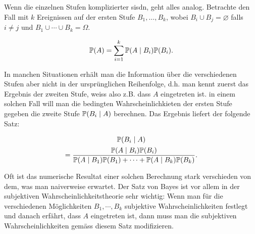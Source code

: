 Wenn die einzelnen Stufen komplizierter sisdn, geht alles analog. Betrachte den Fall mit $k$ Ereignissen auf der ersten Stufe $B_1,\ldots,B_k$, wobei $B_i\cup B_j=\varnothing$ falls $i\neq j$ und $B_1\cup \cdots \cup B_k=\Omega$.
\begin{satz}
	\begin{gather*}
		\mathbb P(A)=\sum_{i=1}^{k}\mathbb P(A\mid B_i)\mathbb P(B_i).
	\end{gather*}
\end{satz}
In manchen Situationen erhält man die Information über die verschiedenen Stufen aber nicht in der ursprünglichen Reihenfolge, d.h. man kennt zuerst das Ergebnis der zweiten Stufe, weiss also z.B. dass $A$ eingetreten ist. in einem solchen Fall will man die bedingten Wahrscheinlichkieten der ersten Stufe gegeben die zweite Stufe $\mathbb P(B_i\mid A)$ berechnen. Das Ergebnis liefert der folgende Satz:
\begin{satz}
	\begin{multline*}
		\mathbb P(B_i\mid A)\\=\frac{\mathbb P(A\mid B_i)\mathbb P(B_i)}{\mathbb P(A\mid B_1)\mathbb P(B_1)+ \cdots+ \mathbb P(A\mid B_k)\mathbb P(B_k)}.
	\end{multline*}
\end{satz}
Oft ist das numerische Resultat einer solchen Berechnung stark verschieden von dem, was man naiverweise erwartet. Der Satz von Bayes ist vor allem in der subjektiven Wahrscheinlichkeitstheorie sehr wichtig: Wenn man für die verschiedenen Möglichkeiten $B_1,\cdots,B_k$ subjektive Wahrscheinlichkeiten festlegt und danach erfährt, dass $A$ eingetreten ist, dann muss man die subjektiven Wahrscheinlichkeiten gemäss diesem Satz modifizieren.
